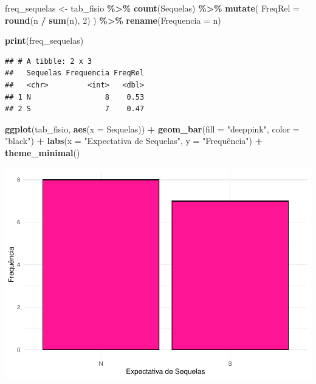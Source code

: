 \documentclass[
]{book}
\newenvironment{Shaded}{\begin{snugshade}}{\end{snugshade}}
\newcommand{\AttributeTok}[1]{\textcolor[rgb]{0.13,0.29,0.53}{#1}}
\newcommand{\DecValTok}[1]{\textcolor[rgb]{0.00,0.00,0.81}{#1}}
\newcommand{\FunctionTok}[1]{\textcolor[rgb]{0.13,0.29,0.53}{\textbf{#1}}}
\newcommand{\NormalTok}[1]{#1}
\newcommand{\OtherTok}[1]{\textcolor[rgb]{0.56,0.35,0.01}{#1}}
\newcommand{\SpecialCharTok}[1]{\textcolor[rgb]{0.81,0.36,0.00}{\textbf{#1}}}
\newcommand{\StringTok}[1]{\textcolor[rgb]{0.31,0.60,0.02}{#1}}
\begin{document}
\begin{Shaded}
\begin{Highlighting}[]
\NormalTok{freq\_sequelas }\OtherTok{\textless{}{-}}\NormalTok{ tab\_fisio }\SpecialCharTok{\%\textgreater{}\%}
  \FunctionTok{count}\NormalTok{(Sequelas) }\SpecialCharTok{\%\textgreater{}\%}
  \FunctionTok{mutate}\NormalTok{(}
    \AttributeTok{FreqRel =} \FunctionTok{round}\NormalTok{(n }\SpecialCharTok{/} \FunctionTok{sum}\NormalTok{(n), }\DecValTok{2}\NormalTok{)}
\NormalTok{  ) }\SpecialCharTok{\%\textgreater{}\%}
  \FunctionTok{rename}\NormalTok{(}\AttributeTok{Frequencia =}\NormalTok{ n)}

\FunctionTok{print}\NormalTok{(freq\_sequelas)}
\end{Highlighting}
\end{Shaded}

\begin{verbatim}
## # A tibble: 2 x 3
##   Sequelas Frequencia FreqRel
##   <chr>         <int>   <dbl>
## 1 N                 8    0.53
## 2 S                 7    0.47
\end{verbatim}

\begin{Shaded}
\begin{Highlighting}[]
\FunctionTok{ggplot}\NormalTok{(tab\_fisio, }\FunctionTok{aes}\NormalTok{(}\AttributeTok{x =}\NormalTok{ Sequelas)) }\SpecialCharTok{+}
  \FunctionTok{geom\_bar}\NormalTok{(}\AttributeTok{fill =} \StringTok{"deeppink"}\NormalTok{, }\AttributeTok{color =} \StringTok{"black"}\NormalTok{) }\SpecialCharTok{+}
  \FunctionTok{labs}\NormalTok{(}\AttributeTok{x =} \StringTok{"Expectativa de Sequelas"}\NormalTok{, }\AttributeTok{y =} \StringTok{"Frequência"}\NormalTok{) }\SpecialCharTok{+}
  \FunctionTok{theme\_minimal}\NormalTok{()}
\end{Highlighting}
\end{Shaded}

\begin{center}\includegraphics{AED_files/figure-latex/cap6_ex1bs-1} \end{center}
\end{document}
